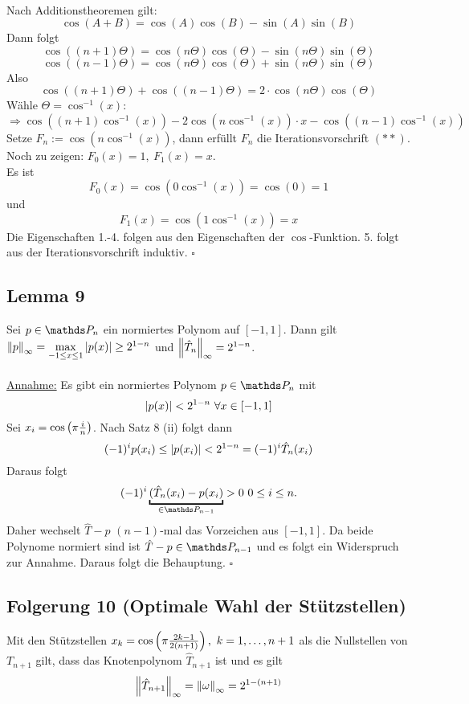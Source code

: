 \\
Nach Additionstheoremen gilt:
\[
\cos(A+B) =\cos(A)\cos(B)-\sin(A)\sin(B)
\]
Dann folgt
\[
\cos((n+1)\Theta)=\cos(n\Theta)\cos(\Theta)-\sin(n\Theta)\sin(\Theta)
\]
\[
\cos((n-1)\Theta)=\cos(n\Theta)\cos(\Theta)+\sin(n\Theta)\sin(\Theta)
\]
Also 
\[
\cos((n+1)\Theta)+\cos((n-1)\Theta) = 2\cdot \cos(n\Theta)\cos(\Theta)
\]
Wähle $\Theta=\cos^{-1}(x)$:
\[
\Rightarrow \cos((n+1)\cos^{-1}(x))-2\cos(n\cos^{-1}(x))\cdot x - \cos((n-1)\cos^{-1}(x))
\]
Setze $F_n:= \cos(n\cos^{-1}(x))$, dann erfüllt $F_n$ die Iterationsvorschrift $(\ast\ast)$.\\
Noch zu zeigen: $F_0(x)=1,~F_1(x)=x$.\\
Es ist 
\[
F_0(x)=\cos (0\cos^{-1}(x))=\cos(0)=1
\]
und
\[
F_1(x) = \cos(1\cos^{-1}(x))=x
\]
Die Eigenschaften 1.-4. folgen aus den Eigenschaften der $\cos$-Funktion.
5. folgt aus der Iterationsvorschrift induktiv.
\hfill $\square$

\subsection{Lemma 9}
\label{sub:lemma_9}
Sei $p\in \Pw_n$ ein normiertes Polynom auf $[-1,1]$.
Dann gilt $\norm{p}_\infty=\max\limits_{-1\le x\le 1} \abs{p(x)}\ge 2^{1-n}$ und $\norm{\hat{T}_n}_\infty=2^{1-n}$.\\

\\
\uline{Annahme:} 
Es gibt ein normiertes Polynom $p\in\Pw_n$ mit 
\[
\left\vert p(x)\right\vert< 2^{1-n}~\forall x\in[-1,1]
\]
Sei $x_i=\cos\left( \pi\frac{i}{n}\right)$. 
Nach Satz 8 (ii) folgt dann
\[
(-1)^ip(x_i)\le \left\vert p(x_i)\right\vert<2^{1-n}=(-1)^i\hat{T}_n(x_i)
\]
Daraus folgt
\[
(-1)^i\underbracket{(\hat{T}_n(x_i)-p(x_i)}_{\in \Pw_{n-1}}>0~0\le i\le n.
\]
Daher wechselt $\hat{T}-p$ $(n-1)$-mal das Vorzeichen aus $[-1,1]$.
Da beide Polynome normiert sind ist $\hat{T}-p\in \Pw_{n-1}$ und es folgt ein Widerspruch zur Annahme.
Daraus folgt die Behauptung.
\hfill $\square$

\subsection{Folgerung 10 (Optimale Wahl der Stützstellen)}
\label{sub:folgerung_10}
Mit den Stützstellen $x_k=\cos\left( \pi\frac{2k-1}{2(n+1)}\right),~k=1, \dots ,n+1$ als die Nullstellen von $T_{n+1}$ gilt, dass das Knotenpolynom $\hat{T}_{n+1}$ ist und es gilt 
\[
\norm{\hat{T}_{n+1}}_\infty=\norm{\omega}_\infty=2^{1-(n+1)}
\]

